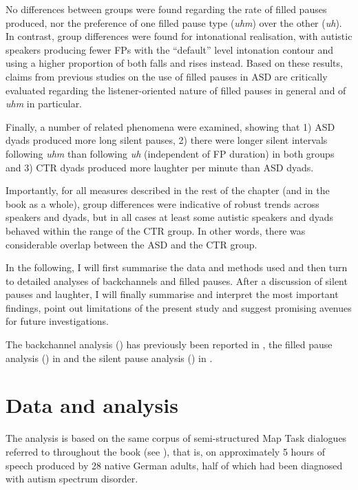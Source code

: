 No differences between groups were found regarding the rate of filled pauses produced, nor the preference of one filled pause type (\emph{uhm}) over the other (\emph{uh}). In contrast, group differences were found for intonational realisation, with autistic speakers producing fewer FPs with the ``default'' level intonation contour and using a higher proportion of both falls and rises instead.
Based on these results, claims from previous studies on the use of filled pauses in ASD are critically evaluated regarding the listener-oriented nature of filled pauses in general and of \emph{uhm} in particular. \

Finally, a number of related phenomena were examined, showing that 1) ASD dyads produced more long silent pauses, 2) there were longer silent intervals following \emph{uhm} than following \emph{uh} (independent of FP duration) in both groups and 3) CTR dyads produced more laughter per minute than ASD dyads.

Importantly, for all measures described in the rest of the chapter (and in the book as a whole), group differences were indicative of robust trends across speakers and dyads, but in all cases at least some autistic speakers and dyads behaved within the range of the CTR group. In other words, there was considerable overlap between the ASD and the CTR group.

In the following, I will first summarise the data and methods used and then turn to detailed analyses of backchannels and filled pauses. After a discussion of silent pauses and laughter, I will finally summarise and interpret the most important findings, point out limitations of the present study and suggest promising avenues for future investigations.

The backchannel analysis () has previously been reported in \citet{wehrleBackchannelsConversationsAutistic2023}, the filled pause analysis () in \citet{wehrleFilledPausesProduced2023} and the silent pause analysis () in \citet{wehrleCharacteristicsDistributionSilent2023}.





\section{Data and analysis}\label{sec:BCFP_data}

The analysis is based on the same corpus of semi-structured Map Task dialogues referred to throughout the book (see ), that is, on approximately 5 hours of speech produced by 28 native German adults, half of which had been diagnosed with autism spectrum disorder.

